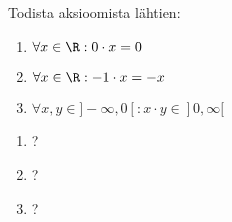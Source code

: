 \begin{tehtava}
Todista aksioomista lähtien:
\begin{enumerate}[(1)]
\item $\forall x \in \R: 0 \cdot x = 0$
\item $\forall x \in \R: -1 \cdot x = -x$
\item $\forall x, y \in ]-\infty,0[: x \cdot y \in ]0,\infty[$
\end{enumerate}
\begin{vastaus}
\begin{enumerate}[(1)]
    \item ? %
    \item ? %
    \item ? %
\end{enumerate}
\end{vastaus}
\end{tehtava}

